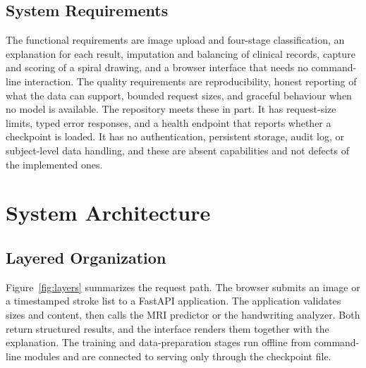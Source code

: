 \documentclass[conference]{IEEEtran}
\begin{document}
\subsection{System Requirements}
The functional requirements are image upload and four-stage classification, an explanation for each result, imputation and balancing of clinical records, capture and scoring of a spiral drawing, and a browser interface that needs no command-line interaction. The quality requirements are reproducibility, honest reporting of what the data can support, bounded request sizes, and graceful behaviour when no model is available. The repository meets these in part. It has request-size limits, typed error responses, and a health endpoint that reports whether a checkpoint is loaded. It has no authentication, persistent storage, audit log, or subject-level data handling, and these are absent capabilities and not defects of the implemented ones.

\section{System Architecture}
\subsection{Layered Organization}
Figure~\ref{fig:layers} summarizes the request path. The browser submits an image or a timestamped stroke list to a FastAPI application. The application validates sizes and content, then calls the MRI predictor or the handwriting analyzer. Both return structured results, and the interface renders them together with the explanation. The training and data-preparation stages run offline from command-line modules and are connected to serving only through the checkpoint file.
\end{document}
